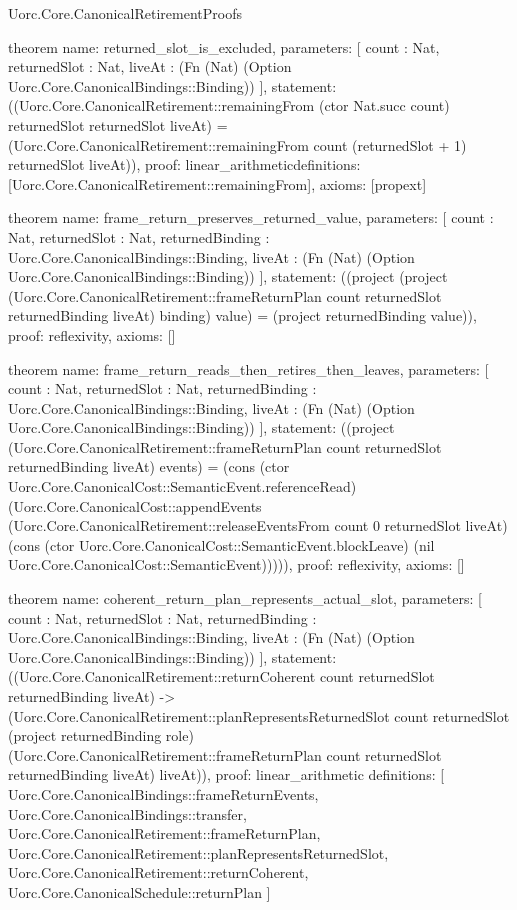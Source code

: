\begin{lexlean}{Uorc.Core.CanonicalRetirementProofs}
\begin{semanticmodule}
theorem{
  name: returned_slot_is_excluded,
  parameters: [
    count : Nat,
    returnedSlot : Nat,
    liveAt : (Fn (Nat) (Option Uorc.Core.CanonicalBindings::Binding))
  ],
  statement: ((Uorc.Core.CanonicalRetirement::remainingFrom (ctor Nat.succ count) returnedSlot returnedSlot liveAt) = (Uorc.Core.CanonicalRetirement::remainingFrom count (returnedSlot + 1) returnedSlot liveAt)),
  proof: linear_arithmetic{definitions: [Uorc.Core.CanonicalRetirement::remainingFrom]},
  axioms: [propext]
}

theorem{
  name: frame_return_preserves_returned_value,
  parameters: [
    count : Nat,
    returnedSlot : Nat,
    returnedBinding : Uorc.Core.CanonicalBindings::Binding,
    liveAt : (Fn (Nat) (Option Uorc.Core.CanonicalBindings::Binding))
  ],
  statement: ((project (project (Uorc.Core.CanonicalRetirement::frameReturnPlan count returnedSlot returnedBinding liveAt) binding) value) = (project returnedBinding value)),
  proof: reflexivity{},
  axioms: []
}

theorem{
  name: frame_return_reads_then_retires_then_leaves,
  parameters: [
    count : Nat,
    returnedSlot : Nat,
    returnedBinding : Uorc.Core.CanonicalBindings::Binding,
    liveAt : (Fn (Nat) (Option Uorc.Core.CanonicalBindings::Binding))
  ],
  statement: ((project (Uorc.Core.CanonicalRetirement::frameReturnPlan count returnedSlot returnedBinding liveAt) events) = (cons (ctor Uorc.Core.CanonicalCost::SemanticEvent.referenceRead) (Uorc.Core.CanonicalCost::appendEvents (Uorc.Core.CanonicalRetirement::releaseEventsFrom count 0 returnedSlot liveAt) (cons (ctor Uorc.Core.CanonicalCost::SemanticEvent.blockLeave) (nil Uorc.Core.CanonicalCost::SemanticEvent))))),
  proof: reflexivity{},
  axioms: []
}

theorem{
  name: coherent_return_plan_represents_actual_slot,
  parameters: [
    count : Nat,
    returnedSlot : Nat,
    returnedBinding : Uorc.Core.CanonicalBindings::Binding,
    liveAt : (Fn (Nat) (Option Uorc.Core.CanonicalBindings::Binding))
  ],
  statement: ((Uorc.Core.CanonicalRetirement::returnCoherent count returnedSlot returnedBinding liveAt) -> (Uorc.Core.CanonicalRetirement::planRepresentsReturnedSlot count returnedSlot (project returnedBinding role) (Uorc.Core.CanonicalRetirement::frameReturnPlan count returnedSlot returnedBinding liveAt) liveAt)),
  proof: linear_arithmetic{
    definitions: [
      Uorc.Core.CanonicalBindings::frameReturnEvents,
      Uorc.Core.CanonicalBindings::transfer,
      Uorc.Core.CanonicalRetirement::frameReturnPlan,
      Uorc.Core.CanonicalRetirement::planRepresentsReturnedSlot,
      Uorc.Core.CanonicalRetirement::returnCoherent,
      Uorc.Core.CanonicalSchedule::returnPlan
    ]
  }
}


\end{semanticmodule}
\end{lexlean}

